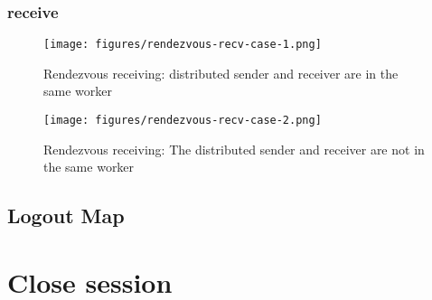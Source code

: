 \begin{content}
\subsubsection{receive}

\begin{figure}[H]
\centering
\texttt{[image: figures/rendezvous-recv-case-1.png]}
\caption{Rendezvous receiving: distributed sender and receiver are in the same worker}
 \label{fig:rendezvous-recv-case-1}
\end{figure}

\begin{figure}[H]
\centering
\texttt{[image: figures/rendezvous-recv-case-2.png]}
\caption{Rendezvous receiving: The distributed sender and receiver are not in the same worker}
 \label{fig:rendezvous-recv-case-2}
\end{figure}

\subsection{Logout Map}

\end{content}

\section{Close session}

